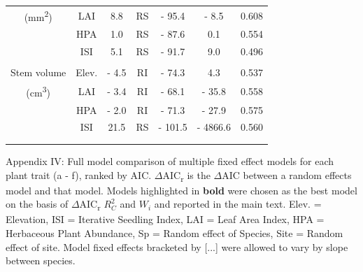 \documentclass[a4paper,10pt,]{report}
\begin{document}
\begin{table}[H]
\begin{tabular}{@{\extracolsep{5pt}} ccScSS[table-figures-integer = 4, table-figures-decimal=3]
S}
(mm\textsuperscript{2}) & LAI &  8.8 & RS &    - 95.4 &    - 8.5  &  0.608  \\ 
 & HPA &  1.0 & RS &    - 87.6 &  0.1  &  0.554  \\ 
 & ISI &  5.1 & RS &    - 91.7 &  9.0  &  0.496  \\ 
\hline \\[-1.8ex] 
Stem volume & Elev. &    - 4.5 & RI &    - 74.3 &  4.3  &  0.537  \\ 
(cm\textsuperscript{3}) & LAI &    - 3.4 & RI &    - 68.1 &    - 35.8  &  0.558  \\ 
 & HPA &    - 2.0 & RI &    - 71.3 &    - 27.9  &  0.575  \\ 
 & ISI &  21.5 & RS &    - 101.5 &    - 4866.6  &  0.560  \\ 
\hline \\[-1.8ex] 
\hline \\
\end{tabular} 
\end{table} 
\clearpage
Appendix IV: Full model comparison of multiple fixed effect models for each plant trait (a - f), ranked by AIC. $\Delta$AIC\textsubscript{r} is the $\Delta$AIC between a random effects model and that model. Models highlighted in \textbf{bold} were chosen as the best model on the basis of $\Delta$AIC\textsubscript{r} $R_C^2$ and $W_i$ and reported in the main text. Elev. = Elevation, ISI = Iterative Seedling Index, LAI = Leaf Area Index, HPA = Herbaceous Plant Abundance, Sp = Random effect of Species, Site = Random effect of site. Model fixed effects bracketed by [...] were allowed to vary by slope between species.
\end{document}
